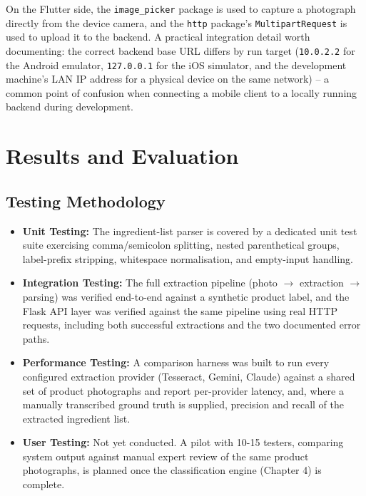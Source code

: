 \documentclass{report}
\begin{document}
On the Flutter side, the \texttt{image\_picker} package is used to
capture a photograph directly from the device camera, and the
\texttt{http} package's \texttt{MultipartRequest} is used to upload it
to the backend. A practical integration detail worth documenting: the
correct backend base URL differs by run target (\texttt{10.0.2.2} for
the Android emulator, \texttt{127.0.0.1} for the iOS simulator, and the
development machine's LAN IP address for a physical device on the same
network) -- a common point of confusion when connecting a mobile client
to a locally running backend during development.


\chapter{Results and Evaluation}

\section{Testing Methodology}

\begin{itemize}
  \item \textbf{Unit Testing:} The ingredient-list parser is covered by a
    dedicated unit test suite exercising comma/semicolon splitting,
    nested parenthetical groups, label-prefix stripping, whitespace
    normalisation, and empty-input handling.
  \item \textbf{Integration Testing:} The full extraction pipeline
    (photo $\rightarrow$ extraction $\rightarrow$ parsing) was verified
    end-to-end against a synthetic product label, and the Flask API
    layer was verified against the same pipeline using real HTTP
    requests, including both successful extractions and the two
    documented error paths.
  \item \textbf{Performance Testing:} A comparison harness was built to
    run every configured extraction provider (Tesseract, Gemini, Claude)
    against a shared set of product photographs and report per-provider
    latency, and, where a manually transcribed ground truth is supplied,
    precision and recall of the extracted ingredient list.
  \item \textbf{User Testing:} Not yet conducted. A pilot with 10-15
    testers, comparing system output against manual expert review of the
    same product photographs, is planned once the classification engine
    (Chapter 4) is complete.
\end{itemize}
\end{document}
